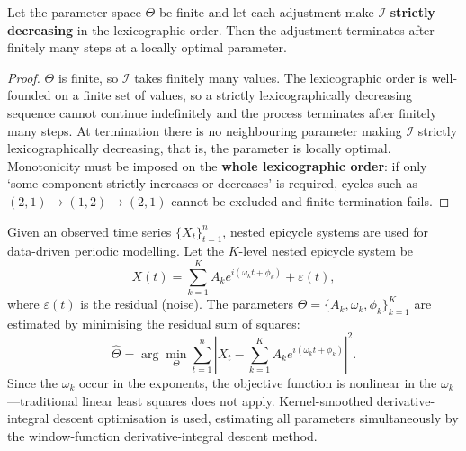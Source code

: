 \begin{proposition}\label{prop:data_structure_metric_convergence}
Let the parameter space $\Theta$ be finite and let each adjustment make $\mathcal I$ \textbf{strictly decreasing} in the lexicographic order. Then the adjustment terminates after finitely many steps at a locally optimal parameter.
\end{proposition}

\begin{proof}
$\Theta$ is finite, so $\mathcal I$ takes finitely many values. The lexicographic order is well-founded on a finite set of values, so a strictly lexicographically decreasing sequence cannot continue indefinitely and the process terminates after finitely many steps. At termination there is no neighbouring parameter making $\mathcal I$ strictly lexicographically decreasing, that is, the parameter is locally optimal. Monotonicity must be imposed on the \textbf{whole lexicographic order}: if only `some component strictly increases or decreases' is required, cycles such as $(2,1)\to(1,2)\to(2,1)$ cannot be excluded and finite termination fails.
\end{proof}

\begin{definition}\label{def:nested_epicycle_fitting}
Given an observed time series $\{X_t\}_{t=1}^{n}$, nested epicycle systems are used for data-driven periodic modelling. Let the $K$-level nested epicycle system be
\[
X(t) = \sum_{k=1}^{K} A_k e^{i(\omega_k t + \phi_k)} + \varepsilon(t),
\]
where $\varepsilon(t)$ is the residual (noise). The parameters $\Theta = \{A_k, \omega_k, \phi_k\}_{k=1}^{K}$ are estimated by minimising the residual sum of squares:
\[
\hat{\Theta} = \arg\min_{\Theta} \sum_{t=1}^{n} \left| X_t - \sum_{k=1}^{K} A_k e^{i(\omega_k t + \phi_k)} \right|^2.
\]
Since the $\omega_k$ occur in the exponents, the objective function is nonlinear in the $\omega_k$---traditional linear least squares does not apply. Kernel-smoothed derivative-integral descent optimisation is used, estimating all parameters simultaneously by the window-function derivative-integral descent method.
\end{definition}

